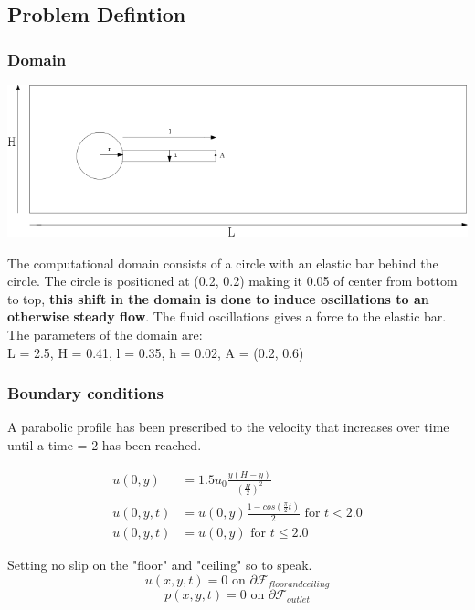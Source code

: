 \subsection*{Problem Defintion}
\subsubsection*{Domain}

\begin{center}
\includegraphics[scale=0.4]{./Verification_Validation/Hron_Turek/Domain_drawing.png}
\end{center}

The computational domain consists of a circle with an elastic bar behind the circle. The circle is positioned at (0.2, 0.2) making it 0.05 of center from bottom to top, \textbf{this shift in the domain is done to induce oscillations to an otherwise steady flow}. The fluid oscillations gives a force to the elastic bar. The parameters of the domain are:\\
L = 2.5, H = 0.41, l = 0.35, h = 0.02, A = (0.2, 0.6) \\

\subsubsection*{Boundary conditions}
A parabolic profile has been prescribed to the velocity that increases over time until a time = 2 has been reached.

\begin{align*}
u(0,y) &= 1.5u_0 \frac{y(H-y)}{(\frac{H}{2})^2}  \\
u(0,y,t) &= u(0,y)\frac{1-cos(\frac{\pi}{2}t)}{2} \text{  for  } t<2.0 \\
u(0,y,t) &= u(0,y) \text{  for  } t \leq 2.0
\end{align*}

Setting no slip on the "floor" and "ceiling" so to speak.\\
$$ u(x,y,t) = 0 \text{  on  } \partial \mathcal{F}_{floor and ceiling} $$
$$  p(x,y,t) = 0 \text{  on  } \partial \mathcal{F}_{outlet} $$

